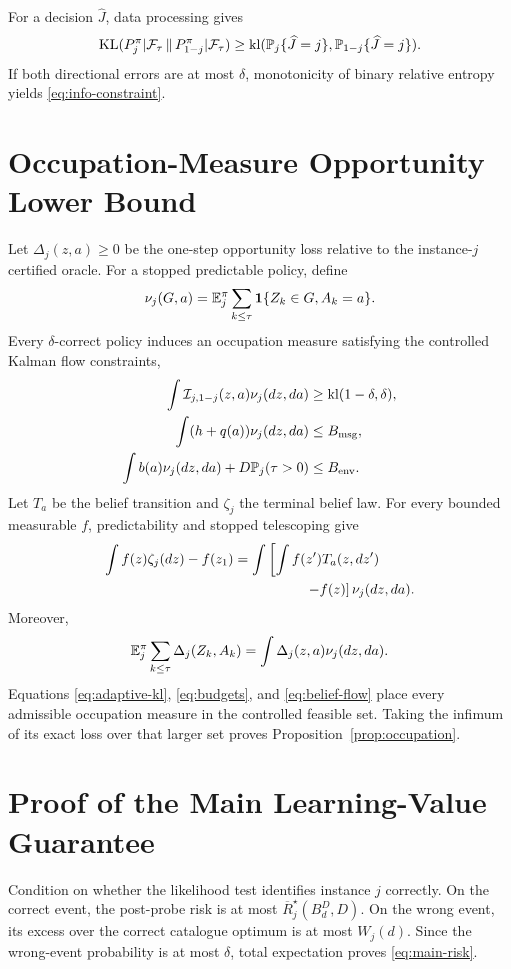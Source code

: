 For a decision $\widehat J$, data processing gives
\begin{equation}
\operatorname{KL}(P_j^\pi|\mathcal{F}_\tau\,\|\,P_{1-j}^\pi|\mathcal{F}_\tau)\ge\operatorname{kl}(\mathbb{P}_j\{\widehat J=j\},\mathbb{P}_{1-j}\{\widehat J=j\}).
\end{equation}
If both directional errors are at most $\delta$, monotonicity of binary relative entropy yields \eqref{eq:info-constraint}.

\section{Occupation-Measure Opportunity Lower Bound}
Let $\Delta_j(z,a)\ge0$ be the one-step opportunity loss relative to the instance-$j$ certified oracle.
For a stopped predictable policy, define
\begin{equation}
\nu_j(G,a)=\mathbb{E}_j^\pi\sum_{k\le\tau}\mathbf{1}\{Z_k\in G,A_k=a\}.
\end{equation}
Every $\delta$-correct policy induces an occupation measure satisfying the controlled Kalman flow constraints,
\begin{align}
\int\mathcal{I}_{j,1-j}(z,a)\nu_j(dz,da)&\ge\operatorname{kl}(1-\delta,\delta),\nonumber\\
\int(h+q(a))\nu_j(dz,da)&\le B_{\rm msg},\nonumber\\
\int b(a)\nu_j(dz,da)+D\mathbb{P}_j(\tau>0)&\le B_{\rm env}.
\end{align}
Let $T_a$ be the belief transition and $\zeta_j$ the terminal belief law.
For every bounded measurable $f$, predictability and stopped telescoping give
\begin{align}
\int f(z)\zeta_j(dz)-f(z_1)
&=\int\left[\int f(z')T_a(z,dz')\right.\nonumber\\
&\left.\hspace{18mm}-f(z)\right]\nu_j(dz,da).
\label{eq:belief-flow}
\end{align}
Moreover,
\begin{equation}
\mathbb{E}_j^\pi\sum_{k\le\tau}\Delta_j(Z_k,A_k)
=\int\Delta_j(z,a)\nu_j(dz,da).
\end{equation}
Equations \eqref{eq:adaptive-kl}, \eqref{eq:budgets}, and \eqref{eq:belief-flow} place every admissible occupation measure in the controlled feasible set.
Taking the infimum of its exact loss over that larger set proves Proposition~\ref{prop:occupation}.

\section{Proof of the Main Learning-Value Guarantee}
Condition on whether the likelihood test identifies instance $j$ correctly.
On the correct event, the post-probe risk is at most $\overline R_j^\star(B_d^D,D)$.
On the wrong event, its excess over the correct catalogue optimum is at most $W_j(d)$.
Since the wrong-event probability is at most $\delta$, total expectation proves \eqref{eq:main-risk}.

